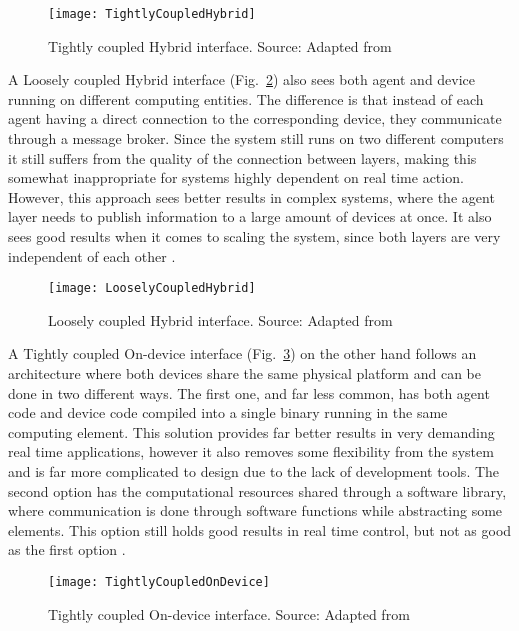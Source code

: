 \begin{figure}[]
	\centering
	\texttt{[image: TightlyCoupledHybrid]}
	\caption{Tightly coupled Hybrid interface. Source: Adapted from \cite{8591641}}
	\label{fig:tightly_coupled_hybrid}
\end{figure}

A Loosely coupled Hybrid interface (Fig.~\ref{fig:loosely_coupled_hybrid}) also sees both agent and device running on different computing entities. The difference is that instead of each agent having a direct connection to the corresponding device, they communicate through a message broker. Since the system still runs on two different computers it still suffers from the quality of the connection between layers, making this somewhat inappropriate for systems highly dependent on real time action. However, this approach sees better results in complex systems, where the agent layer needs to publish information to a large amount of devices at once. It also sees good results when it comes to scaling the system, since both layers are very independent of each other \cite{8591641}.\\

\begin{figure}[h!]
	\centering
	\texttt{[image: LooselyCoupledHybrid]}
	\caption{Loosely coupled Hybrid interface. Source: Adapted from \cite{8591641}}
	\label{fig:loosely_coupled_hybrid}
\end{figure}

A Tightly coupled On-device interface (Fig.~\ref{fig:tightly_coupled_ondevice}) on the other hand follows an architecture where both devices share the same physical platform and can be done in two different ways. The first one, and far less common, has both agent code and device code compiled into a single binary running in the same computing element. This solution provides far better results in very demanding real time applications, however it also removes some flexibility from the system and is far more complicated to design due to the lack of development tools. The second option has the computational resources shared through a software library, where communication is done through software functions while abstracting some elements. This option still holds good results in real time control, but not as good as the first option \cite{8591641}.\\

\begin{figure}[H]
	\centering
	\texttt{[image: TightlyCoupledOnDevice]}
	\caption{Tightly coupled On-device interface. Source: Adapted from \cite{8591641}}
	\label{fig:tightly_coupled_ondevice}
\end{figure}

